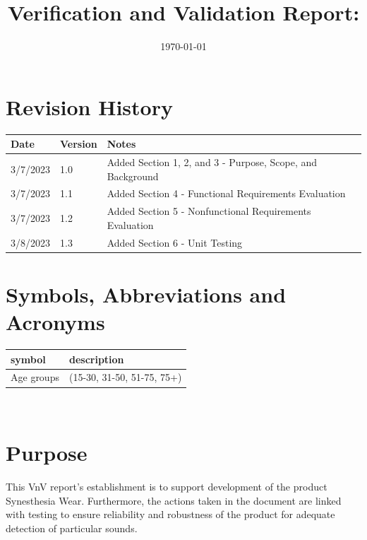 \documentclass[12pt, titlepage]{article}
\begin{document}
\title{Verification and Validation Report: \progname} 
\author{\authname}
\date{\today}
	
\maketitle


\section*{Revision History}

\begin{tabularx}{\textwidth}{p{3cm}p{2cm}X}
\toprule {\bf Date} & {\bf Version} & {\bf Notes}\\
\midrule
3/7/2023 & 1.0 & Added Section 1, 2, and 3 - Purpose, Scope, and Background\\
3/7/2023 & 1.1 & Added Section 4 - Functional Requirements Evaluation\\
3/7/2023 & 1.2 & Added Section 5 - Nonfunctional Requirements Evaluation\\
3/8/2023 & 1.3 & Added Section 6 - Unit Testing\\
\bottomrule
\end{tabularx}

\newpage

\tableofcontents

\listoftables

\newpage

\section*{Symbols, Abbreviations and Acronyms}


\renewcommand{\arraystretch}{1.2}
\begin{tabular}{l l} 
  \toprule		
  \textbf{symbol} & \textbf{description}\\
  \midrule 
  Age groups & (15-30, 31-50, 51-75, 75+)\\
  \bottomrule
\end{tabular}\\

\newpage


\section{Purpose}

This VnV report's establishment is to support development of the product Synesthesia Wear. Furthermore, the actions taken in the document are linked with testing to ensure reliability and robustness of the product for adequate detection of particular sounds.
\end{document}
